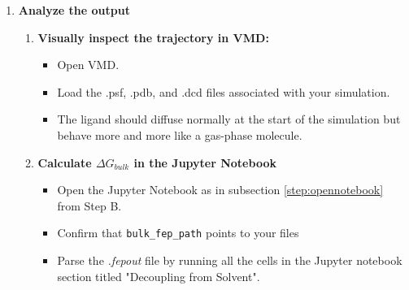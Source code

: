 \documentclass[9pt,tutorial]{Styling/livecoms}
\newcommand{\filepath}[1]{\textit{#1}}
\newcommand{\textInput}[1]{
  \texttt{#1}
}
\begin{document}
\begin{enumerate}
        \item \textbf{Analyze the output} \label{step:analyzeBulk}
        \begin{enumerate}[label=\alph*., ref=\theenumi.\alph*]
            \item \textbf{Visually inspect the trajectory in VMD:}
            \begin{itemize}
                \item Open VMD.
                \item Load the .psf, .pdb, and .dcd files associated with your simulation.
                \item The ligand should diffuse normally at the start of the simulation but behave more and more like a gas-phase molecule.
            \end{itemize}
            \item \textbf{Calculate $\Delta G_{bulk}$ in the Jupyter Notebook}
            \begin{itemize}
                \item Open the Jupyter Notebook as in subsection \ref{step:opennotebook} from Step B.
                \item Confirm that \textInput{bulk\_fep\_path} points to your files
                \item Parse the \filepath{.fepout} file by running all the cells in the Jupyter notebook section titled "Decoupling from Solvent".
            \end{itemize}

        \end{enumerate}

    \end{enumerate}
\end{document}
